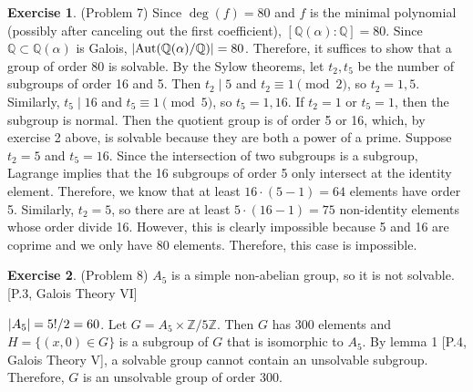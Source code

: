 \documentclass[12pt, psamsfonts]{amsart}
\theoremstyle{definition}
\newtheorem*{exer}{Exercise}
\theoremstyle{remark}
\DeclareMathOperator{\Aut}{Aut}
\numberwithin{equation}{section}
\begin{document}
\begin{exer}{(Problem 7)}
  Since $\deg(f) = 80$ and $f$ is the minimal polynomial (possibly after canceling out the first coefficient), $[\mathbb{Q}(\alpha):\mathbb{Q}] = 80$.
  Since $\mathbb{Q} \subset \mathbb{Q}(\alpha)$ is Galois, $\abs{\Aut(\mathbb{Q}(\alpha)/\mathbb{Q})} = 80$.
  Therefore, it suffices to show that a group of order 80 is solvable.
  By the Sylow theorems, let $t_2, t_5$ be the number of subgroups of order 16 and 5.
  Then $t_2 \mid 5$ and $t_2 \equiv 1 \pmod 2$, so $t_2 = 1, 5$.
  Similarly, $t_5 \mid 16$ and $t_5 \equiv 1 \pmod 5$, so $t_5 = 1, 16$.
  If $t_2 = 1$ or $t_5 = 1$, then the subgroup is normal.
  Then the quotient group is of order 5 or 16, which, by exercise 2 above, is solvable because they are both a power of a prime.
  Suppose $t_2 = 5$ and $t_5 = 16$.
  Since the intersection of two subgroups is a subgroup, Lagrange implies that the 16 subgroups of order 5 only intersect at the identity element.
  Therefore, we know that at least $16 \cdot (5 - 1) = 64$ elements have order 5.
  Similarly, $t_2 = 5$, so there are at least $5 \cdot (16 - 1) = 75$ non-identity elements whose order divide 16.
  However, this is clearly impossible because 5 and 16 are coprime and we only have 80 elements.
  Therefore, this case is impossible.
\end{exer}

\begin{exer}{(Problem 8)}
  $A_5$ is a simple non-abelian group, so it is not solvable.
  [P.3, Galois Theory VI]

  $\abs{A_5} = 5! / 2 = 60$.
  Let $G = A_5 \times \mathbb{Z}/5\mathbb{Z}$.
  Then $G$ has 300 elements and $H = \{ (x, 0) \in G \}$ is a subgroup of $G$ that is isomorphic to $A_5$.
  By lemma 1 [P.4, Galois Theory V], a solvable group cannot contain an unsolvable subgroup.
  Therefore, $G$ is an unsolvable group of order 300.
\end{exer}
\end{document}
